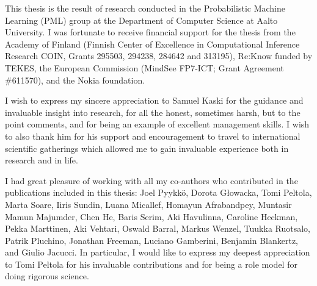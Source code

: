 \documentclass[dissertation,math,vertlayout,pdfa,colorlinks]{aaltoseries}
\begin{document}


 




\begin{preface}[Espoo]



This thesis is the result of research conducted in the Probabilistic Machine Learning (PML) group at the Department of Computer Science at Aalto University. I was fortunate to receive financial support for the thesis from the Academy of Finland (Finnish Center of Excellence in Computational Inference Research COIN, Grants 295503, 294238, 284642 and 313195), Re:Know funded by TEKES, the European Commission (MindSee FP7-ICT; Grant Agreement \#611570), and the Nokia foundation. 

I wish to express my sincere appreciation to Samuel Kaski for the guidance and invaluable insight into research, for all the honest, sometimes harsh, but to the point comments, and for being an example of excellent management skills. I wish to also thank him for his support and encouragement to travel to international scientific gatherings which allowed me to gain invaluable experience both in research and in life.

I had great pleasure of working with all my co-authors who contributed in the publications included in this thesis: Joel Pyykk\"o, Dorota G\l{}owacka, Tomi Peltola, Marta Soare, Iiris Sundin, Luana Micallef, Homayun Afrabandpey, Muntasir Mamun Majumder, Chen He, Baris Serim, Aki Havulinna, Caroline Heckman, Pekka Marttinen, Aki Vehtari, Oswald Barral, Markus Wenzel, Tuukka Ruotsalo, Patrik Pluchino, Jonathan Freeman, Luciano Gamberini, Benjamin Blankertz, and Giulio Jacucci. %
In particular, I would like to express my deepest appreciation to Tomi Peltola for his invaluable contributions and for being a role model for doing rigorous science. %


\end{preface}
\end{document}
